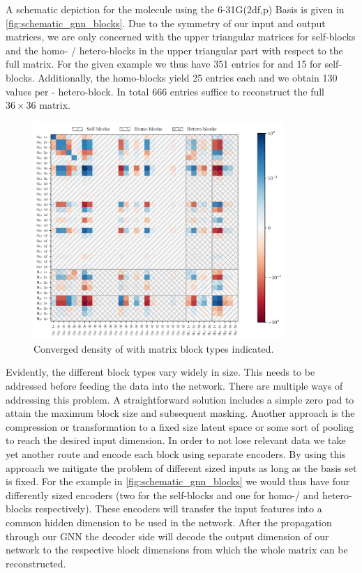 A schematic depiction for the  molecule using the 6-31G(2df,p) Basis is given in \autoref{fig:schematic_gnn_blocks}. Due to the symmetry of our input and output matrices, we are only concerned with the upper triangular matrices for self-blocks and the homo- / hetero-blocks in the upper triangular part with respect to the full matrix. For the given example we thus have 351 entries for  and 15 for  self-blocks. Additionally, the  homo-blocks yield 25 entries each and we obtain 130 values per - hetero-block. In total 666 entries suffice to reconstruct the full $36 \times 36$ matrix. 
\begin{figure}[H]
    \centering
    \includegraphics[width=0.85\textwidth]{../fig/gnn/schematic_blocks.pdf}
    \caption[Matrix block regions of ]{Converged density of  with matrix block types indicated.}
    \label{fig:schematic_gnn_blocks}
\end{figure}
Evidently, the different block types vary widely in size. This needs to be addressed before feeding the data into the network. There are multiple ways of addressing this problem. A straightforward solution includes a simple zero pad to attain the maximum block size and subsequent masking. Another approach is the compression or transformation to a fixed size latent space or some sort of pooling to reach the desired input dimension. In order to not lose relevant data we take yet another route and encode each block using separate encoders. By using this approach we mitigate the problem of different sized inputs as long as the basis set is fixed. For the example in \autoref{fig:schematic_gnn_blocks} we would thus have four differently sized encoders (two for the self-blocks and one for homo-/ and hetero-blocks respectively). These encoders will transfer the input features into a common hidden dimension to be used in the network. After the propagation through our GNN the decoder side will decode the output dimension of our network to the respective block dimensions from which the whole matrix can be reconstructed.
